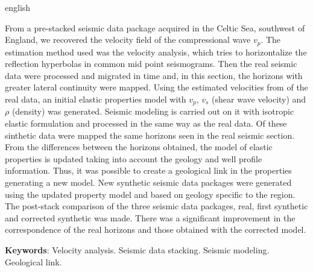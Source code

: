\documentclass[
	12pt,				%
	openright,			%
	oneside,			%
	a4paper,			%
	english,			%
	brazil				%
	]{abntex2}
\newcommand{\listofquadrosname}{Lista de quadros}
\begin{document}
\begin{resumo}[Abstract]
    \begin{otherlanguage*}{english}

	From a pre-stacked seismic data package acquired in the Celtic Sea, southwest of England, we recovered the velocity field of the compressional wave $v_p$. The estimation method used was the velocity analysis, which tries to horizontalize the reflection hyperbolas in common mid point seismograms. Then the real seismic data were processed and migrated in time and, in this section, the horizons with greater lateral continuity were mapped. Using the estimated velocities from of the real data, an initial elastic properties model with $v_p$, $v_s$ (shear wave velocity) and $\rho$ (density) was generated. Seismic modeling is carried out on it with isotropic elastic formulation and processed in the same way as the real data. Of these sinthetic data were mapped the same horizons seen in the real seismic section. From the differences between the horizons obtained, the model of elastic properties is updated taking into account the geology and well profile information. Thus, it was possible to create a geological link in the properties generating a new model. New synthetic seismic data packages were generated using the updated property model and based on geology specific to the region. The post-stack comparison of the three seismic data packages, real, first synthetic and corrected synthetic was made. There was a significant improvement in the correspondence of the real horizons and those obtained with the corrected model.

    \vspace{\onelineskip}
    \newline
    \textbf{Keywords}: Velocity analysis. Seismic data stacking. Seismic modeling. Geological link.
    \end{otherlanguage*}
\end{resumo}

\listoffigures*
\cleardoublepage


\end{document}

